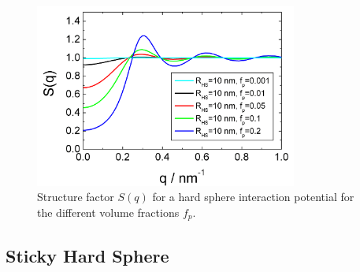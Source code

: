 \begin{figure}[htb]
\begin{center}
\includegraphics[width=0.768\textwidth]{../images/structure_factor/HardSphere/HardSphereSQ.png}
\end{center}
\caption{Structure factor $S(q)$ for a hard sphere interaction potential for the different volume fractions $f_p$.}
\label{fig:SQHardSphere}
\end{figure}



\clearpage
\subsection{Sticky Hard Sphere} ~\\

